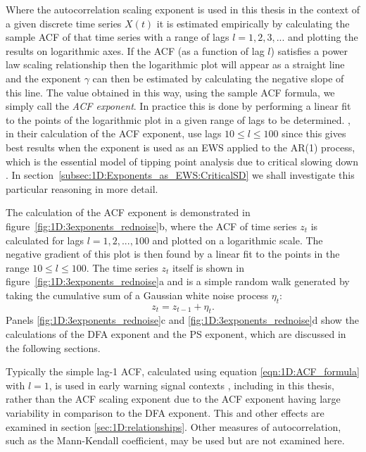 {Where the autocorrelation scaling exponent is used in this thesis in the context of a given discrete time series $X(t)$ it is estimated empirically by calculating the sample ACF of that time series with a range of lags $l = 1,2,3,...$ and plotting the results on logarithmic axes. If the ACF (as a function of lag $l$) satisfies a power law scaling relationship then the logarithmic plot will appear as a straight line and the exponent $\gamma$ can then be estimated by  calculating the negative slope of this line. The value obtained in this way, using the sample ACF formula, we simply call the \emph{ACF exponent}. In practice this is done by performing a linear fit to the points of the logarithmic plot in a given range of lags to be determined. \cite{livina2007}, in their calculation of the ACF exponent, use lags $10\leq l \leq 100$ since this gives best results when the exponent is used as an EWS applied to the AR(1) process, which is the essential model of tipping point analysis due to critical slowing down \citep{scheffer2009critical}. In section~\ref{subsec:1D:Exponents_as_EWS:CriticalSD} we shall investigate this particular reasoning in more detail.

The calculation of the ACF exponent is demonstrated in figure~\ref{fig:1D:3exponents_rednoise}b, where the ACF of time series $z_t$ is calculated for lags $l=1,2,...,100$ and plotted on a logarithmic scale. The negative gradient of this plot is then found by a linear fit to the points in the range $10\leq l \leq 100$. The time series $z_t$ itself is shown in figure~\ref{fig:1D:3exponents_rednoise}a and is a simple random walk generated by taking the cumulative sum of a Gaussian white noise process $\eta_t$:
	\begin{equation}
		z_t = z_{t-1}+\eta_t.
		\label{eqn:1D:simple_brownian}
	\end{equation} 
Panels \ref{fig:1D:3exponents_rednoise}c and \ref{fig:1D:3exponents_rednoise}d show the calculations of the DFA exponent and the PS exponent, which are discussed in the following sections. 

Typically the simple lag-1 ACF, calculated using equation \ref{eqn:1D:ACF_formula} with $l=1$, is used in early warning signal contexts \citep{held2004}, including in this thesis, rather than the ACF scaling exponent due to the ACF exponent having large variability in comparison to the DFA exponent. This and other effects are examined in section \ref{sec:1D:relationships}. Other measures of autocorrelation, such as the Mann-Kendall coefficient, may be used \citep{yue2002} but are not examined here.
}


